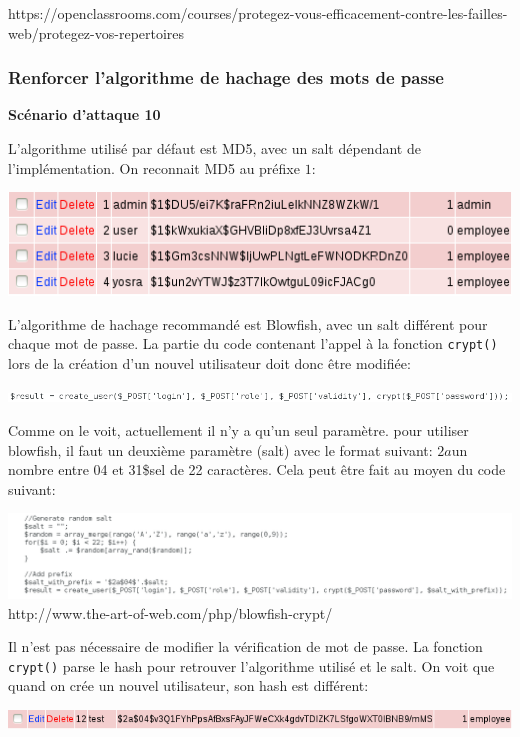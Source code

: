 \documentclass{article}
\begin{document}
https://openclassrooms.com/courses/protegez-vous-efficacement-contre-les-failles-web/protegez-vos-repertoires

\subsubsection{Renforcer l'algorithme de hachage des mots de passe}

\textbf{Scénario d'attaque 10}

L'algorithme utilisé par défaut est MD5, avec un salt dépendant de
l'implémentation. On reconnait MD5 au préfixe \(1\):

\includegraphics{images/crypt_avant.PNG}

L'algorithme de hachage recommandé est Blowfish, avec un salt différent
pour chaque mot de passe. La partie du code contenant l'appel à la
fonction \texttt{crypt()} lors de la création d'un nouvel utilisateur
doit donc être modifiée:

\includegraphics{images/crypt_avant2.PNG}

Comme on le voit, actuellement il n'y a qu'un seul paramètre. pour
utiliser blowfish, il faut un deuxième paramètre (salt) avec le format
suivant: \(2a\)un nombre entre 04 et 31\$sel de 22 caractères. Cela peut
être fait au moyen du code suivant:

\includegraphics{images/crypt_apres.PNG}
http://www.the-art-of-web.com/php/blowfish-crypt/

Il n'est pas nécessaire de modifier la vérification de mot de passe. La
fonction \texttt{crypt()} parse le hash pour retrouver l'algorithme
utilisé et le salt. On voit que quand on crée un nouvel utilisateur, son
hash est différent:

\includegraphics{images/crypt_apres2.PNG}
\end{document}
